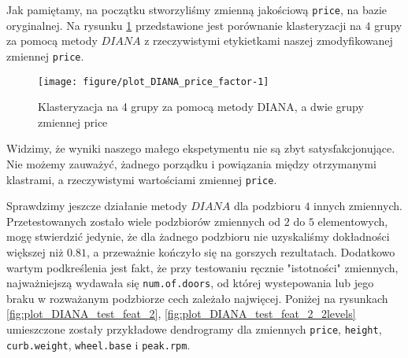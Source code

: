 \documentclass[12pt, a4paper]{article}\usepackage[]{graphicx}\usepackage[]{xcolor}
\makeatletter
\def\maxwidth{ %
  \ifdim\Gin@nat@width>\linewidth
    \linewidth
  \else
    \Gin@nat@width
  \fi
}
\newenvironment{knitrout}{}{} %
\makeatother
\begin{document}
\par Jak pamiętamy, na początku stworzyliśmy zmienną jakościową \texttt{price}, na bazie oryginalnej. Na rysunku \ref{fig:plot_DIANA_price_factor} przedstawione jest porównanie klasteryzacji na $4$ grupy za pomocą metody $DIANA$ z rzeczywistymi etykietkami naszej zmodyfikowanej zmiennej \texttt{price}.
\begin{knitrout}
\color{fgcolor}\begin{figure}[H]

{\centering \texttt{[image: figure/plot\_DIANA\_price\_factor-1]} 

}

\caption[Klasteryzacja na 4 grupy za pomocą metody DIANA, a dwie grupy zmiennej price]{Klasteryzacja na 4 grupy za pomocą metody DIANA, a dwie grupy zmiennej price}\label{fig:plot_DIANA_price_factor}
\end{figure}

\end{knitrout}
Widzimy, że wyniki naszego małego ekspetymentu nie są zbyt satysfakcjonujące. Nie możemy zauważyć, żadnego porządku i powiązania między otrzymanymi klastrami, a rzeczywistymi wartościami zmiennej \texttt{price}.

\par Sprawdzimy jeszcze działanie metody $DIANA$ dla podzbioru $4$ innych zmiennych. Przetestowanych zostało wiele podzbiorów zmiennych od $2$ do $5$ elementowych, mogę stwierdzić jedynie, że dla żadnego podzbioru nie uzyskaliśmy dokładności większej niż $0.81$, a przeważnie kończyło się na gorszych rezultatach. Dodatkowo wartym podkreślenia jest fakt, że przy testowaniu ręcznie "istotności" zmiennych, najważniejszą wydawała się \texttt{num.of.doors}, od której wystepowania lub jego braku w rozważanym podzbiorze cech zależało najwięcej. Poniżej na rysunkach \ref{fig:plot_DIANA_test_feat_2}, \ref{fig:plot_DIANA_test_feat_2_2levels} umieszczone zostały przykładowe dendrogramy dla zmiennych \texttt{price}, \texttt{height}, \texttt{curb.weight}, \texttt{wheel.base} i \texttt{peak.rpm}. 
\end{document}
